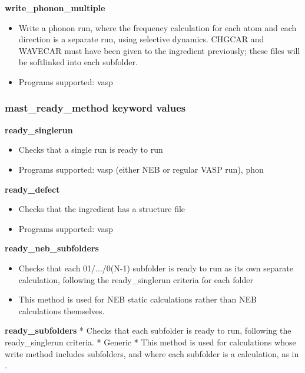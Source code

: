 \documentclass[letterpaper,10pt,english]{sphinxmanual}
\begin{document}
\textbf{write\_phonon\_multiple}
\begin{itemize}
\item {} 
Write a phonon run, where the frequency calculation for each atom and each direction is a separate run, using selective dynamics. CHGCAR and WAVECAR must have been given to the ingredient previously; these files will be softlinked into each subfolder.

\item {} 
Programs supported: vasp

\end{itemize}


\subsubsection{mast\_ready\_method keyword values}
\label{3_1_2_ingredients:mast-ready-method-keyword-values}
\textbf{ready\_singlerun}
\begin{itemize}
\item {} 
Checks that a single run is ready to run

\item {} 
Programs supported: vasp (either NEB or regular VASP run), phon

\end{itemize}

\textbf{ready\_defect}
\begin{itemize}
\item {} 
Checks that the ingredient has a structure file

\item {} 
Programs supported: vasp

\end{itemize}

\textbf{ready\_neb\_subfolders}
\begin{itemize}
\item {} 
Checks that each 01/.../0(N-1) subfolder is ready to run as its own separate calculation, following the ready\_singlerun criteria for each folder

\item {} 
This method is used for NEB static calculations rather than NEB calculations themselves.

\end{itemize}

\textbf{ready\_subfolders}
*  Checks that each subfolder is ready to run, following the ready\_singlerun criteria.
*  Generic
*  This method is used for calculations whose write method includes subfolders, and where each subfolder is a calculation, as in .
\end{document}
